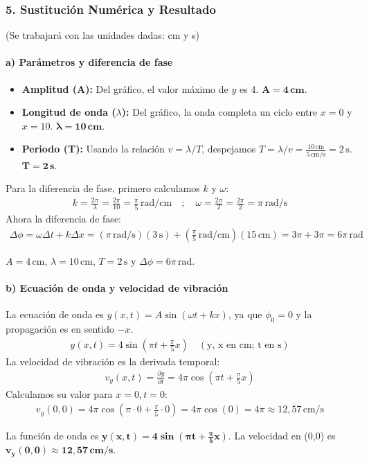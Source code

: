 \subsubsection*{5. Sustitución Numérica y Resultado}
(Se trabajará con las unidades dadas: cm y s)
\paragraph*{a) Parámetros y diferencia de fase}
\begin{itemize}
    \item \textbf{Amplitud (A):} Del gráfico, el valor máximo de $y$ es 4. $\boldsymbol{A=4\,\textbf{cm}}$.
    \item \textbf{Longitud de onda ($\lambda$):} Del gráfico, la onda completa un ciclo entre $x=0$ y $x=10$. $\boldsymbol{\lambda=10\,\textbf{cm}}$.
    \item \textbf{Periodo (T):} Usando la relación $v=\lambda/T$, despejamos $T = \lambda/v = \frac{10\,\text{cm}}{5\,\text{cm/s}} = 2\,\text{s}$. $\boldsymbol{T=2\,\textbf{s}}$.
\end{itemize}
Para la diferencia de fase, primero calculamos $k$ y $\omega$:
\begin{gather}
    k = \frac{2\pi}{\lambda} = \frac{2\pi}{10} = \frac{\pi}{5}\,\text{rad/cm} \quad ; \quad \omega = \frac{2\pi}{T} = \frac{2\pi}{2} = \pi\,\text{rad/s}
\end{gather}
Ahora la diferencia de fase:
\begin{gather}
    \Delta\phi = \omega\Delta t + k\Delta x = (\pi\,\text{rad/s})(3\,\text{s}) + (\frac{\pi}{5}\,\text{rad/cm})(15\,\text{cm}) = 3\pi + 3\pi = 6\pi\,\text{rad}
\end{gather}
\begin{cajaresultado}
    $A=4\,\text{cm}$, $\lambda=10\,\text{cm}$, $T=2\,\text{s}$ y $\Delta\phi=6\pi\,\text{rad}$.
\end{cajaresultado}
\paragraph*{b) Ecuación de onda y velocidad de vibración}
La ecuación de onda es $y(x,t) = A\sin(\omega t + kx)$, ya que $\phi_0=0$ y la propagación es en sentido $-x$.
\begin{gather}
    y(x,t) = 4\sin(\pi t + \frac{\pi}{5}x) \quad (\text{y, x en cm; t en s})
\end{gather}
La velocidad de vibración es la derivada temporal:
\begin{gather}
    v_y(x,t) = \frac{\partial y}{\partial t} = 4\pi\cos(\pi t + \frac{\pi}{5}x)
\end{gather}
Calculamos su valor para $x=0, t=0$:
\begin{gather}
    v_y(0,0) = 4\pi\cos(\pi \cdot 0 + \frac{\pi}{5} \cdot 0) = 4\pi\cos(0) = 4\pi \approx 12,57\,\text{cm/s}
\end{gather}
\begin{cajaresultado}
    La función de onda es $\boldsymbol{y(x,t) = 4\sin(\pi t + \frac{\pi}{5}x)}$. La velocidad en (0,0) es $\boldsymbol{v_y(0,0) \approx 12,57\,\textbf{cm/s}}$.
\end{cajaresultado}

